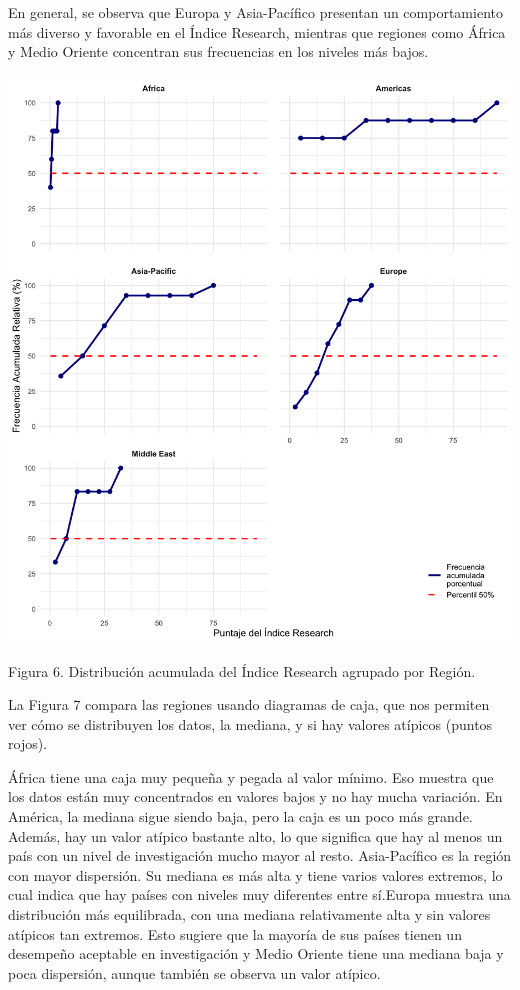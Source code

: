 \documentclass[
]{article}
\begin{document}
\begin{multicols}{2}
En general, se observa que Europa y Asia-Pacífico presentan un comportamiento más diverso y favorable en el Índice Research, mientras que regiones como África y Medio Oriente concentran sus frecuencias en los niveles más bajos.




\begin{center}
\includegraphics[width=\linewidth]{figura6.png}
\end{center}
Figura 6. Distribución acumulada del Índice Research agrupado por Región.

La Figura 7 compara las regiones usando diagramas de caja, que nos permiten ver cómo se distribuyen los datos, la mediana, y si hay valores atípicos (puntos rojos).

África tiene una caja muy pequeña y pegada al valor mínimo. Eso muestra que los datos están muy concentrados en valores bajos y no hay mucha variación. En América, la mediana sigue siendo baja, pero la caja es un poco más grande. Además, hay un valor atípico bastante alto, lo que significa que hay al menos un país con un nivel de investigación mucho mayor al resto. Asia-Pacífico es la región con mayor dispersión. Su mediana es más alta y tiene varios valores extremos, lo cual indica que hay países con niveles muy diferentes entre sí.Europa muestra una distribución más equilibrada, con una mediana relativamente alta y sin valores atípicos tan extremos. Esto sugiere que la mayoría de sus países tienen un desempeño aceptable en investigación y Medio Oriente tiene una mediana baja y poca dispersión, aunque también se observa un valor atípico.


\end{multicols}
\end{document}
